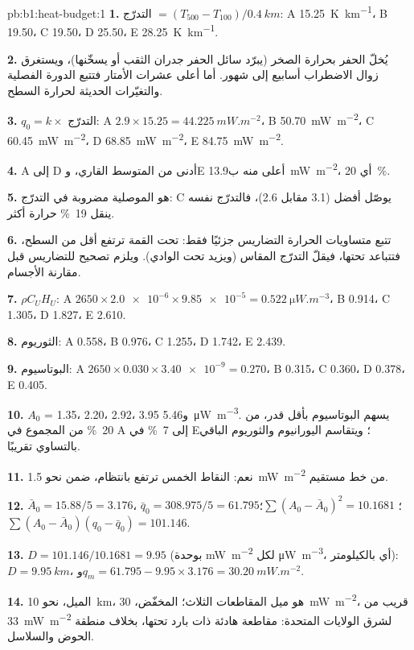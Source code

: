 \begin{solution}{pb:b1:heat-budget:1}
\textbf{1.} التدرّج $= (T_{500} - T_{100})/\qty{0.4}{km}$: A \qty{15.25}{K.km^{-1}}،
B \num{19.50}، C \num{19.50}، D \num{25.50}، E \qty{28.25}{K.km^{-1}}.

\textbf{2.} يُخلّ الحفر بحرارة الصخر (يبرّد سائل الحفر جدران الثقب أو يسخّنها)، ويستغرق زوال الاضطراب أسابيع إلى شهور. أما أعلى عشرات الأمتار فتتبع الدورة الفصلية والتغيّرات الحديثة لحرارة السطح.

\textbf{3.} $q_0 = k\times$ التدرّج: A $2.9\times15.25 = \qty{44.225}{mW.m^{-2}}$،
B \qty{50.70}{mW.m^{-2}}، C \qty{60.45}{mW.m^{-2}}، D \qty{68.85}{mW.m^{-2}}،
E \qty{84.75}{mW.m^{-2}}.

\textbf{4.} A إلى D أدنى من المتوسط القاري، وE أعلى منه ب\qty{13.9}{mW.m^{-2}}، أي \qty{20}{\percent}.

\textbf{5.}  هو الموصلية مضروبة في التدرّج: C يوصّل أفضل (3.1 مقابل 2.6)، فالتدرّج نفسه ينقل \qty{19}{\percent} حرارة أكثر.

\textbf{6.} تتبع متساويات الحرارة التضاريس جزئيًا فقط: تحت القمة ترتفع أقل من السطح، فتتباعد تحتها، فيقلّ التدرّج المقاس (ويزيد تحت الوادي). ويلزم تصحيح للتضاريس قبل مقارنة الأجسام.

\textbf{7.} $\rho C_U H_U$: A $2650\times\num{2.0e-6}\times\num{9.85e-5} =
\qty{0.522}{\micro W.m^{-3}}$، B 0.914، C 1.305، D 1.827، E 2.610.

\textbf{8.} الثوريوم: A 0.558، B 0.976، C 1.255، D 1.742، E 2.439.

\textbf{9.} البوتاسيوم: A $2650\times0.030\times\num{3.40e-9} = 0.270$، B 0.315،
C 0.360، D 0.378، E 0.405.

\textbf{10.} $A_0$ = 1.35، 2.20، 2.92، 3.95 و\qty{5.46}{\micro W.m^{-3}}.
يسهم البوتاسيوم بأقل قدر، من \qty{20}{\percent} من المجموع في A إلى \qty{7}{\percent} في E؛ ويتقاسم اليورانيوم والثوريوم الباقي بالتساوي تقريبًا.

\textbf{11.} نعم: النقاط الخمس ترتفع بانتظام، ضمن نحو \qty{1.5}{mW.m^{-2}} من خط مستقيم.

\textbf{12.} $\bar A_0 = 15.88/5 = 3.176$، $\bar q_0 = 308.975/5 = 61.795$؛
$\sum(A_0 - \bar A_0)^2 = 10.1681$؛ $\sum(A_0 - \bar A_0)(q_0 - \bar q_0) =
101.146$.

\textbf{13.} $D = 101.146/10.1681 = 9.95$ (بوحدة \unit{mW.m^{-2}} لكل
\unit{\micro W.m^{-3}}، أي بالكيلومتر): $D = \qty{9.95}{km}$، و$q_m = 61.795 -
9.95\times3.176 = \qty{30.20}{mW.m^{-2}}$.

\textbf{14.} الميل، نحو \qty{10}{km}، هو ميل المقاطعات الثلاث؛  المخفّض، \qty{30}{mW.m^{-2}}، قريب من \qty{33}{mW.m^{-2}} لشرق الولايات المتحدة: مقاطعة هادئة ذات  بارد تحتها، بخلاف منطقة الحوض والسلاسل.


\end{solution}
